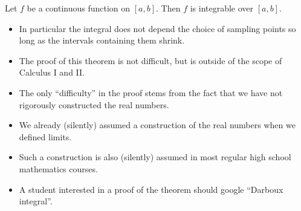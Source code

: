 \begin{frame}
\begin{theorem}
Let $f$ be a continuous function on $[a,b]$. Then $f$ is integrable over $[a,b]$.
\end{theorem}
\begin{itemize}
\item In particular the integral does not depend the choice of sampling points so long as the intervals containing them shrink.
\item The proof of this theorem is not difficult, but is outside of the scope of Calculus I and II.
\item The only ``difficulty'' in the proof stems from the fact that we have not rigorously constructed the real numbers. 
\item We already (silently) assumed a construction of the real numbers when we defined limits. 
\item Such a construction is also (silently) assumed in most regular high school mathematics courses.
\item A student interested in a proof of the theorem should google ``Darboux integral''.
\end{itemize}

\end{frame}
